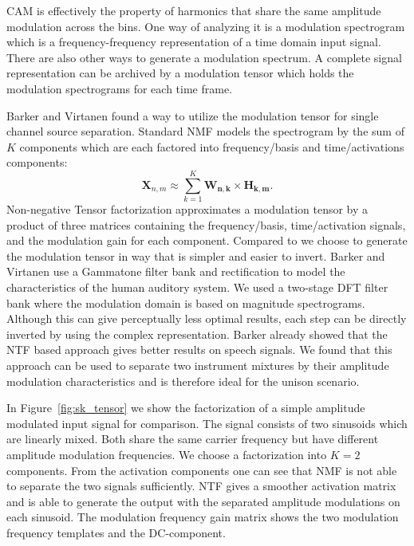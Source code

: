 \textsc{CAM} is effectively the property of harmonics that share the same amplitude modulation across the bins.
One way of analyzing it is a modulation spectrogram which is a frequency-frequency representation of a time domain input signal.
There are also other ways to generate a modulation spectrum.
A complete signal representation can be archived by a modulation tensor which holds the modulation spectrograms for each time frame.


Barker and Virtanen \cite{barker13} found a way to utilize the modulation tensor for single channel source separation. Standard NMF models the spectrogram by the sum of $K$ components which are each factored into frequency/basis and time/activations components:
\begin{equation}
   \mathbf{X}_{n,m} \approx \sum_{k=1}^{K}\mathbf{W_{n,k}}\times \mathbf{H_{k,m}}.
\end{equation}
Non-negative Tensor factorization approximates a modulation tensor by a product of three matrices containing the frequency/basis, time/activation signals, and the modulation gain for each component. Compared to \cite{barker13} we choose to generate the modulation tensor in way that is simpler and easier to invert. Barker and Virtanen use a Gammatone filter bank and  rectification to model the characteristics of the human auditory system. We used a two-stage DFT filter bank where the modulation domain is based on  magnitude spectrograms. Although this can give perceptually less optimal results, each step can be directly inverted by using the complex representation. Barker already showed that the NTF based approach gives better results on speech signals. We found that this approach can be used to separate two instrument mixtures by their amplitude modulation characteristics and is therefore ideal for the unison scenario.

In Figure~\ref{fig:sk_tensor} we show the factorization of a simple amplitude modulated input signal for comparison. The signal consists of two sinusoids which are linearly mixed. Both share the same carrier frequency but have different amplitude modulation frequencies. We choose a factorization into $K=2$ components. From the activation components one can see that NMF is not able to separate the two signals sufficiently. NTF gives a smoother activation matrix and is able to generate the output with the separated amplitude modulations on each sinusoid. The modulation frequency gain matrix shows the two modulation frequency templates and the DC-component.

